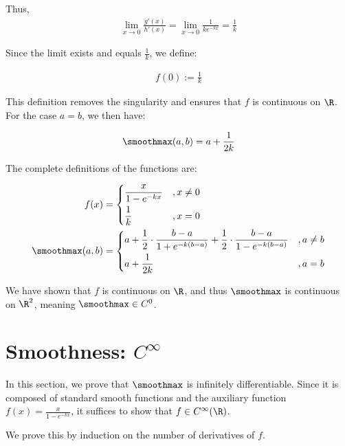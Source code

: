 Thus,
\begin{align}
    \lim_{x \to 0} \frac{g'(x)}{h'(x)} = \lim_{x \to 0} \frac{1}{k e^{-kx}} = \frac{1}{k}
\end{align}

Since the limit exists and equals $\frac{1}{k}$, we define:

\begin{align}
    f(0) := \frac{1}{k}
\end{align}

This definition removes the singularity and ensures that $f$ is continuous on $\R$. For the case $a = b$, we then have:

\begin{align}
    \smoothmax(a, b) = a + \frac{1}{2k}
\end{align}

The complete definitions of the functions are:

\begin{align}
    f(x) &= \begin{dcases}
        \frac{x}{1 - e^{-kx}} &, x \neq 0 \\
        \frac{1}{k} &, x = 0
    \end{dcases} \\
    \smoothmax(a, b) &= \begin{dcases}
        a + \frac{1}{2} \cdot \frac{b - a}{1 + e^{-k(b - a)}} + \frac{1}{2} \cdot \frac{b - a}{1 - e^{-k(b - a)}} &, a \neq b \\
        a + \frac{1}{2k} &, a = b
    \end{dcases}
\end{align}

We have shown that $f$ is continuous on $\R$, and thus $\smoothmax$ is continuous on $\R^2$, meaning $\smoothmax \in C^0$.
\section{Smoothness: $C^\infty$}

In this section, we prove that $\smoothmax$ is infinitely differentiable. Since it is composed of standard smooth functions and the auxiliary function $f(x) = \frac{x}{1 - e^{-kx}}$, it suffices to show that $f \in C^\infty(\R)$.

We prove this by induction on the number of derivatives of $f$.

